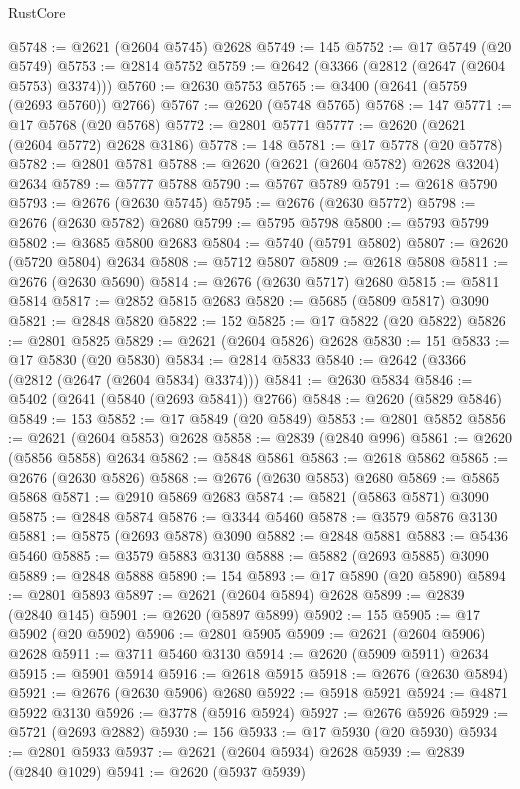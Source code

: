 \begin{lexlean}{RustCore}
\begin{coremodule}
@5748 := @2621 (@2604 @5745) @2628
@5749 := 145
@5752 := @17 @5749 (@20 @5749)
@5753 := @2814 @5752
@5759 := @2642 (@3366 (@2812 (@2647 (@2604 @5753) @3374)))
@5760 := @2630 @5753
@5765 := @3400 (@2641 (@5759 (@2693 @5760)) @2766)
@5767 := @2620 (@5748 @5765)
@5768 := 147
@5771 := @17 @5768 (@20 @5768)
@5772 := @2801 @5771
@5777 := @2620 (@2621 (@2604 @5772) @2628 @3186)
@5778 := 148
@5781 := @17 @5778 (@20 @5778)
@5782 := @2801 @5781
@5788 := @2620 (@2621 (@2604 @5782) @2628 @3204) @2634
@5789 := @5777 @5788
@5790 := @5767 @5789
@5791 := @2618 @5790
@5793 := @2676 (@2630 @5745)
@5795 := @2676 (@2630 @5772)
@5798 := @2676 (@2630 @5782) @2680
@5799 := @5795 @5798
@5800 := @5793 @5799
@5802 := @3685 @5800 @2683
@5804 := @5740 (@5791 @5802)
@5807 := @2620 (@5720 @5804) @2634
@5808 := @5712 @5807
@5809 := @2618 @5808
@5811 := @2676 (@2630 @5690)
@5814 := @2676 (@2630 @5717) @2680
@5815 := @5811 @5814
@5817 := @2852 @5815 @2683
@5820 := @5685 (@5809 @5817) @3090
@5821 := @2848 @5820
@5822 := 152
@5825 := @17 @5822 (@20 @5822)
@5826 := @2801 @5825
@5829 := @2621 (@2604 @5826) @2628
@5830 := 151
@5833 := @17 @5830 (@20 @5830)
@5834 := @2814 @5833
@5840 := @2642 (@3366 (@2812 (@2647 (@2604 @5834) @3374)))
@5841 := @2630 @5834
@5846 := @5402 (@2641 (@5840 (@2693 @5841)) @2766)
@5848 := @2620 (@5829 @5846)
@5849 := 153
@5852 := @17 @5849 (@20 @5849)
@5853 := @2801 @5852
@5856 := @2621 (@2604 @5853) @2628
@5858 := @2839 (@2840 @996)
@5861 := @2620 (@5856 @5858) @2634
@5862 := @5848 @5861
@5863 := @2618 @5862
@5865 := @2676 (@2630 @5826)
@5868 := @2676 (@2630 @5853) @2680
@5869 := @5865 @5868
@5871 := @2910 @5869 @2683
@5874 := @5821 (@5863 @5871) @3090
@5875 := @2848 @5874
@5876 := @3344 @5460
@5878 := @3579 @5876 @3130
@5881 := @5875 (@2693 @5878) @3090
@5882 := @2848 @5881
@5883 := @5436 @5460
@5885 := @3579 @5883 @3130
@5888 := @5882 (@2693 @5885) @3090
@5889 := @2848 @5888
@5890 := 154
@5893 := @17 @5890 (@20 @5890)
@5894 := @2801 @5893
@5897 := @2621 (@2604 @5894) @2628
@5899 := @2839 (@2840 @145)
@5901 := @2620 (@5897 @5899)
@5902 := 155
@5905 := @17 @5902 (@20 @5902)
@5906 := @2801 @5905
@5909 := @2621 (@2604 @5906) @2628
@5911 := @3711 @5460 @3130
@5914 := @2620 (@5909 @5911) @2634
@5915 := @5901 @5914
@5916 := @2618 @5915
@5918 := @2676 (@2630 @5894)
@5921 := @2676 (@2630 @5906) @2680
@5922 := @5918 @5921
@5924 := @4871 @5922 @3130
@5926 := @3778 (@5916 @5924)
@5927 := @2676 @5926
@5929 := @5721 (@2693 @2882)
@5930 := 156
@5933 := @17 @5930 (@20 @5930)
@5934 := @2801 @5933
@5937 := @2621 (@2604 @5934) @2628
@5939 := @2839 (@2840 @1029)
@5941 := @2620 (@5937 @5939)

\end{coremodule}
\end{lexlean}
